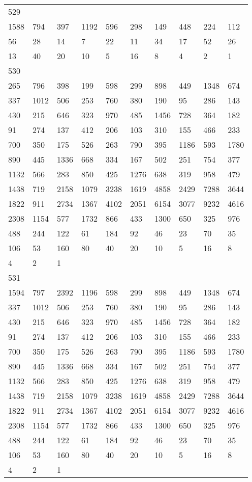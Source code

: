 \begin{longtable}{*{10}{l}}
529&&&&&&&&&\\
1588& 794& 397& 1192& 596& 298& 149& 448& 224& 112\\
56& 28& 14& 7& 22& 11& 34& 17& 52& 26\\
13& 40& 20& 10& 5& 16& 8& 4& 2& 1\\

530&&&&&&&&&\\
265& 796& 398& 199& 598& 299& 898& 449& 1348& 674\\
337& 1012& 506& 253& 760& 380& 190& 95& 286& 143\\
430& 215& 646& 323& 970& 485& 1456& 728& 364& 182\\
91& 274& 137& 412& 206& 103& 310& 155& 466& 233\\
700& 350& 175& 526& 263& 790& 395& 1186& 593& 1780\\
890& 445& 1336& 668& 334& 167& 502& 251& 754& 377\\
1132& 566& 283& 850& 425& 1276& 638& 319& 958& 479\\
1438& 719& 2158& 1079& 3238& 1619& 4858& 2429& 7288& 3644\\
1822& 911& 2734& 1367& 4102& 2051& 6154& 3077& 9232& 4616\\
2308& 1154& 577& 1732& 866& 433& 1300& 650& 325& 976\\
488& 244& 122& 61& 184& 92& 46& 23& 70& 35\\
106& 53& 160& 80& 40& 20& 10& 5& 16& 8\\
4& 2& 1& \\

531&&&&&&&&&\\
1594& 797& 2392& 1196& 598& 299& 898& 449& 1348& 674\\
337& 1012& 506& 253& 760& 380& 190& 95& 286& 143\\
430& 215& 646& 323& 970& 485& 1456& 728& 364& 182\\
91& 274& 137& 412& 206& 103& 310& 155& 466& 233\\
700& 350& 175& 526& 263& 790& 395& 1186& 593& 1780\\
890& 445& 1336& 668& 334& 167& 502& 251& 754& 377\\
1132& 566& 283& 850& 425& 1276& 638& 319& 958& 479\\
1438& 719& 2158& 1079& 3238& 1619& 4858& 2429& 7288& 3644\\
1822& 911& 2734& 1367& 4102& 2051& 6154& 3077& 9232& 4616\\
2308& 1154& 577& 1732& 866& 433& 1300& 650& 325& 976\\
488& 244& 122& 61& 184& 92& 46& 23& 70& 35\\
106& 53& 160& 80& 40& 20& 10& 5& 16& 8\\
4& 2& 1& \\


\end{longtable}
